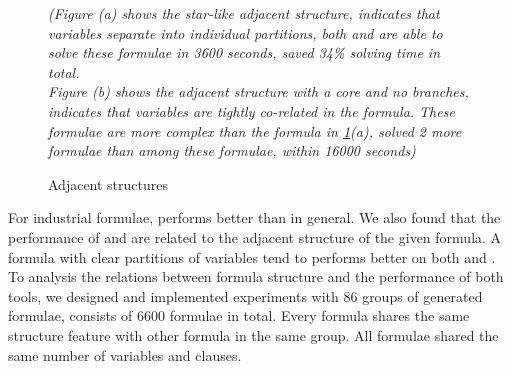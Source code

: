 \begin{figure}[t]
\centering
{}
\caption{Adjacent structures}
\begin{minipage}[t]{0.9\textwidth} \small
\textit{(Figure (a) shows the star-like adjacent structure, indicates that variables separate into individual partitions, both \tool and \minibones are able to solve these formulae in 3600 seconds, \tool saved 34\% solving time in total. \\
Figure (b) shows the adjacent structure with a core and no branches, indicates that variables are tightly co-related in the formula. These formulae are more complex than the formula in \ref{fig:cs}(a), \tool solved 2 more formulae than \minibones among these formulae, within 16000 seconds)}
\end{minipage}

\label{fig:cs}
\end{figure}

For industrial formulae, \tool performs better than \minibones in general. We also found that the performance of \tool and \minibones are related to the adjacent structure of the given formula. A formula with clear partitions of variables tend to performs better on both \tool and \minibones.
To analysis the relations between formula structure and the performance of both tools, we designed and implemented experiments with 86 groups of generated formulae, consists of 6600 formulae in total. Every formula shares the same structure feature with other formula in the same group. All formulae shared the same number of variables and clauses.

